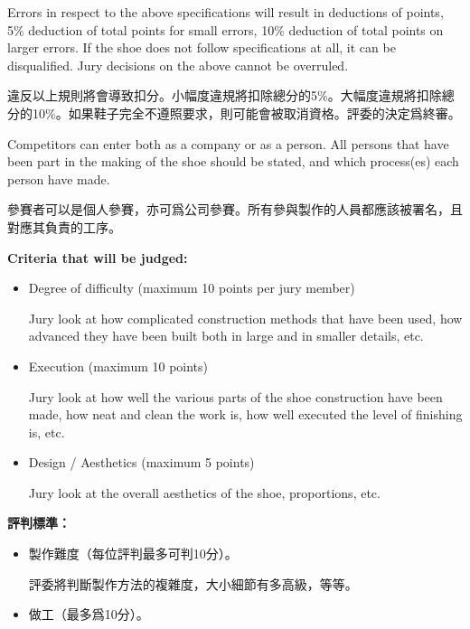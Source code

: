 \begin{paracol}{2}
        Errors in respect to the above specifications will result in deductions of points, 5\% deduction of total points for small errors, 10\% deduction of total points on larger errors. If the shoe does not follow specifications at all, it can be disqualified. Jury decisions on the above cannot be overruled.

        \switchcolumn
        違反以上規則將會導致扣分。小幅度違規將扣除總分的5\%。大幅度違規將扣除總分的10\%。如果鞋子完全不遵照要求，則可能會被取消資格。評委的決定爲終審。
        \switchcolumn*

        Competitors can enter both as a company or as a person. All persons that have been part in the making of the shoe should be stated, and which process(es) each person have made.

        \vspace{1em}

        \switchcolumn
        參賽者可以是個人參賽，亦可爲公司參賽。所有參與製作的人員都應該被署名，且對應其負責的工序。
        \switchcolumn*

        \textbf{Criteria that will be judged:}
        \begin{itemize}
            \item Degree of difficulty (maximum 10 points per jury member)

            Jury look at how complicated construction methods that have been used, how advanced they have been built both in large and in smaller details, etc.

            \item Execution (maximum 10 points)

            Jury look at how well the various parts of the shoe construction have been made, how neat and clean the work is, how well executed the level of finishing is, etc.

            \item Design / Aesthetics (maximum 5 points)

            Jury look at the overall aesthetics of the shoe, proportions, etc.
        \end{itemize}

        \switchcolumn
        \textbf{評判標準：}
        \begin{itemize}
            \item 製作難度（每位評判最多可判10分）。

            評委將判斷製作方法的複雜度，大小細節有多高級，等等。

            \item 做工（最多爲10分）。


\end{itemize}
\end{paracol}
